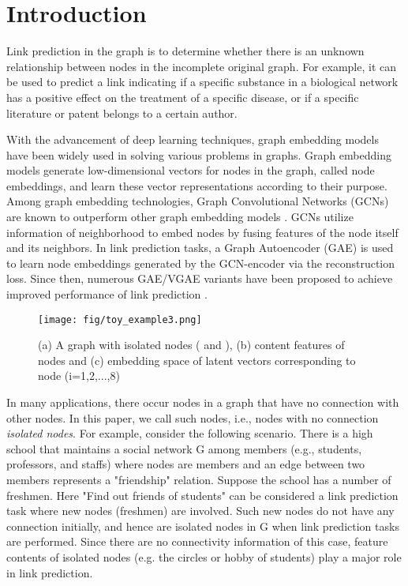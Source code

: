 \documentclass[sigconf]{acmart}
\begin{document}


\maketitle

\section{Introduction}
Link prediction in the graph is to determine whether there is an unknown relationship between nodes in the incomplete original graph.
For example, it can be used to predict a link indicating if a specific substance in a biological network has a positive effect on the treatment of a specific disease, or if a specific literature or patent belongs to a certain author.

With the advancement of deep learning techniques, graph embedding models have been widely used in solving various problems in graphs.
Graph embedding models generate low-dimensional vectors for nodes in the graph, called node embeddings, and learn these vector representations according to their purpose. 
Among graph embedding technologies, Graph Convolutional Networks (GCNs) are known to outperform other graph embedding models \cite{kipf2016semi,defferrard2016convolutional,bruna2013spectral}.
GCNs utilize information of neighborhood to embed nodes by fusing features of the node itself and its neighbors. 
In link prediction tasks, a Graph Autoencoder (GAE) \cite{kipf2016variational} is used to learn node embeddings generated by the GCN-encoder via the reconstruction loss.
Since then, numerous GAE/VGAE variants have been proposed to achieve improved performance of link prediction \cite{pan2018adversarially, salha2020simple, mavromatis2020graph, di2020mutual}.

\begin{figure}[h]
    \centering
    \texttt{[image: fig/toy\_example3.png]}
    \caption{(a) A graph with isolated nodes ( and ), (b) content features of nodes and (c) embedding space of latent vectors corresponding to node  (i=1,2,...,8)}
    \label{fig:cluster}
\end{figure}

In many applications, there occur nodes in a graph that have no connection with other nodes.
In this paper, we call such nodes, i.e., nodes with no connection \textit{isolated nodes}.
For example, consider the following scenario.
There is a high school that maintains a social network G among members (e.g., students, professors, and staffs) where nodes are members and an edge between two members represents a "friendship" relation.
Suppose the school has a number of freshmen.
Here "Find out friends of students" can be considered a link prediction task where new nodes (freshmen) are involved.
Such new nodes do not have any connection initially, and hence are isolated nodes in G when link prediction tasks are performed.
Since there are no connectivity information of this case, feature contents of isolated nodes (e.g. the circles or hobby of students) play a major role in link prediction.
\end{document}
